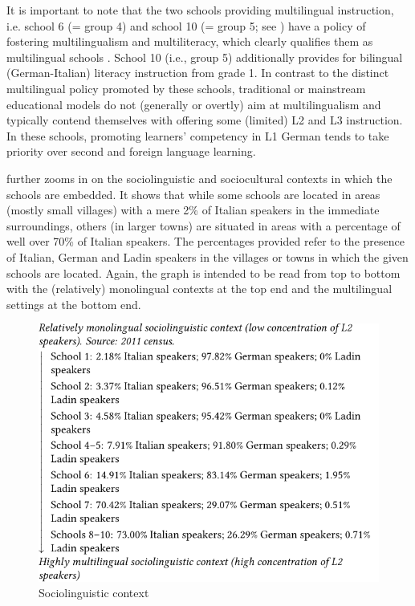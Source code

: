 \documentclass[output=paper]{../langscibook}
\begin{document}
It is important to note that the two schools providing multilingual instruction, i.e. school 6 (= group 4) and school 10 (= group 5; see ) have a policy of fostering multilingualism and multiliteracy, which clearly qualifies them as multilingual schools \citep[32]{Cenoz2009}. School 10 (i.e., group 5) additionally provides for bilingual (German-Italian) literacy instruction from grade 1. In contrast to the distinct multilingual policy promoted by these schools, traditional or mainstream educational models do not (generally or overtly) aim at multilingualism and typically contend themselves with offering some (limited) L2 and L3 instruction. In these schools, promoting learners’ competency in L1 German tends to take priority over second and foreign language learning.

 further zooms in on the sociolinguistic and sociocultural contexts in which the schools are embedded. It shows that while some schools are located in areas (mostly small villages) with a mere 2\% of Italian speakers in the immediate surroundings, others (in larger towns) are situated in areas with a percentage of well over 70\% of Italian speakers. The percentages provided refer to the presence of Italian, German and Ladin speakers in the villages or towns in which the given schools are located. Again, the graph is intended to be read from top to bottom with the (relatively) monolingual contexts at the top end and the multilingual settings at the bottom end.

\begin{figure}
\includegraphics{figures/fig-7-2.pdf}
\caption{Sociolinguistic context\label{fig:7:2}}
\end{figure}
\end{document}
